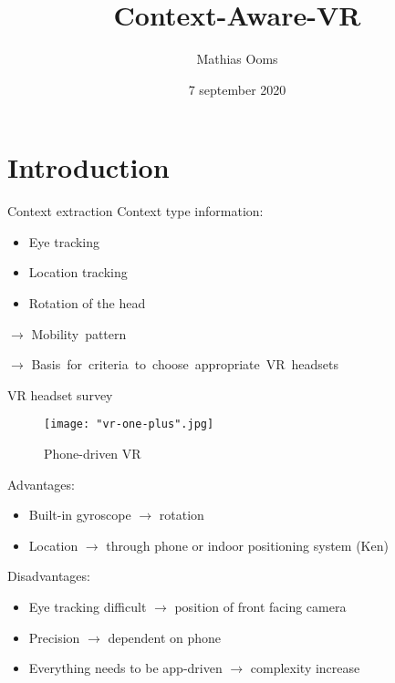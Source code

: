 \documentclass{beamer}
\title[Your Short Title]{Context-Aware-VR}
\author{Mathias Ooms}
\institute{University of Antwerp}
\date{7 september 2020}
\begin{document}
\begin{frame}
  \titlepage
\end{frame}


\section{Introduction}

\begin{frame}{Context extraction}
Context type information: 

\begin{itemize}
	\item Eye tracking
	\item Location tracking 
	\item Rotation of the head
\end{itemize}	
\vspace{0.8cm}
	
$\rightarrow$ Mobility\ pattern

\vspace{1.23cm}

$\rightarrow$ Basis\ for\ criteria\ to\ choose\ appropriate\ VR\ headsets
\end{frame}


\begin{frame}{VR headset survey}
	\begin{figure}
		\texttt{[image: "vr-one-plus".jpg]}
		\caption{Phone-driven VR}
	\end{figure}
	
	Advantages:
	\begin{itemize}
		\item Built-in gyroscope $\rightarrow$ rotation
		\item Location $\rightarrow$ through phone or indoor positioning system (Ken)
	\end{itemize}
	
	Disadvantages:
	\begin{itemize}
		\item Eye tracking difficult $\rightarrow$ position of front facing camera
		\item Precision $\rightarrow$ dependent on phone
		\item Everything needs to be app-driven $\rightarrow$ complexity increase
	\end{itemize}
\end{frame}
\end{document}
